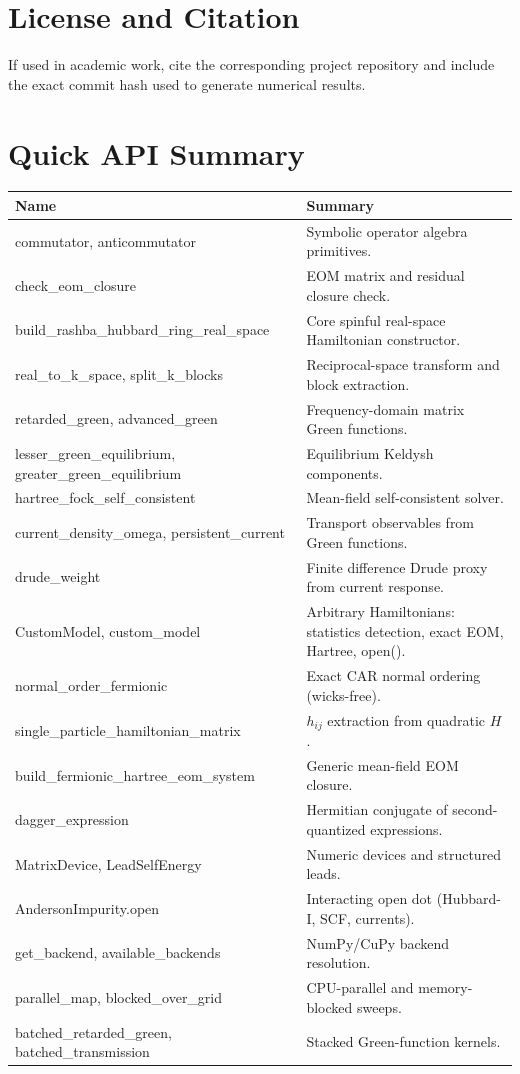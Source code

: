 \documentclass[11pt,a4paper]{article}
\begin{document}
\section{License and Citation}
If used in academic work, cite the corresponding project repository and include the exact commit hash used to generate numerical results.

\appendix
\section{Quick API Summary}
\begin{longtable}{>{\ttfamily}p{} p{}}
\toprule
Name & Summary \\
\midrule
\endhead
commutator, anticommutator & Symbolic operator algebra primitives. \\
check\_eom\_closure & EOM matrix and residual closure check. \\
build\_rashba\_hubbard\_ring\_real\_space & Core spinful real-space Hamiltonian constructor. \\
real\_to\_k\_space, split\_k\_blocks & Reciprocal-space transform and block extraction. \\
retarded\_green, advanced\_green & Frequency-domain matrix Green functions. \\
lesser\_green\_equilibrium, greater\_green\_equilibrium & Equilibrium Keldysh components. \\
hartree\_fock\_self\_consistent & Mean-field self-consistent solver. \\
current\_density\_omega, persistent\_current & Transport observables from Green functions. \\
drude\_weight & Finite difference Drude proxy from current response. \\
CustomModel, custom\_model & Arbitrary Hamiltonians: statistics detection, exact EOM, Hartree, open(). \\
normal\_order\_fermionic & Exact CAR normal ordering (wicks-free). \\
single\_particle\_hamiltonian\_matrix & $h_{ij}$ extraction from quadratic $H$. \\
build\_fermionic\_hartree\_eom\_system & Generic mean-field EOM closure. \\
dagger\_expression & Hermitian conjugate of second-quantized expressions. \\
MatrixDevice, LeadSelfEnergy & Numeric devices and structured leads. \\
AndersonImpurity.open & Interacting open dot (Hubbard-I, SCF, currents). \\
get\_backend, available\_backends & NumPy/CuPy backend resolution. \\
parallel\_map, blocked\_over\_grid & CPU-parallel and memory-blocked sweeps. \\
batched\_retarded\_green, batched\_transmission & Stacked Green-function kernels. \\
\bottomrule
\end{longtable}
\end{document}
